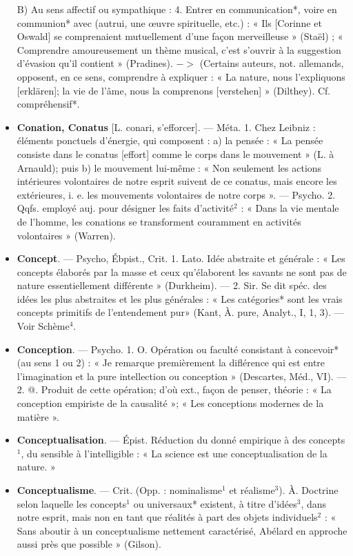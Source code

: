 \begin{itemize}[leftmargin=1cm, label=, itemsep=11pt]
B) Au sens affectif ou sympathique : 4. Entrer en communication*, voire en communion* avec
(autrui, une œuvre spirituelle, etc.) :
« Ils [Corinne et Oswald] se comprenaient mutuellement d’une façon
merveilleuse » (Staël) ; « Comprendre
amoureusement un thème musical,
c'est s'ouvrir à la suggestion d'évasion qu'il contient » (Pradines).
$->$ (Certains auteurs, not. allemands, opposent, en ce sens, comprendre à expliquer : « La nature,
nous l'expliquons [erklären]; la vie
de l'âme, nous la comprenons [verstehen] » (Dilthey). Cf. compréhensif*.

\item {\bf Conation, Conatus} [L. conari, s’efforcer]. — Méta. 1. Chez Leibniz : éléments ponctuels d'énergie, qui composent : a) la pensée : « La pensée
consiste dans le conatus [effort]
comme le corps dans le mouvement » (L. à Arnauld); puis b) le
mouvement lui-même : « Non seulement les actions intérieures volontaires de notre esprit suivent de ce
conatus, mais encore les extérieures,
i. e. les mouvements volontaires de
notre corps ». — Psycho. 2. Qqfs.
employé auj. pour désigner les faits
d'activité$^2$ : « Dans la vie mentale de
l'homme, les conations se transforment
couramment en activités volontaires » (Warren).

\item {\bf Concept}. — Psycho, Ébpist., Crit. 1.
Lato. Idée abstraite et générale :
« Les concepts élaborés par la masse
et ceux qu’élaborent les savants ne
sont pas de nature essentiellement
différente » (Durkheim). — 2. Sir.
Se dit spéc. des idées les plus
abstraites et les plus générales :
« Les catégories* sont les vrais
concepts primitifs de l’entendement
pur» (Kant, À. pure, Analyt., I, 1, 3).
— Voir Schème$^4$.

\item {\bf Conception}. — Psycho. 1. O. Opération ou faculté consistant à concevoir* (au sens 1 ou 2) : « Je remarque
premièrement la diflérence qui est
entre l'imagination et la pure intellection ou conception » (Descartes,
Méd., VI). — 2. @. Produit de cette
opération; d’où ext., façon de penser,
théorie : « La conception empiriste
de la causalité »; « Les conceptions
modernes de la matière ».

\item {\bf Conceptualisation}. — Épist. Réduction
du donné empirique à des concepts$^1$,
du sensible à l'intelligible : « La
science est une conceptualisation de
la nature. »

\item {\bf Conceptualisme}. — Crit. (Opp. : nominalisme$^1$ et réalisme$^3$). À. Doctrine
selon laquelle les concepts$^1$ ou universaux* existent, à titre d'idées$^3$,
dans notre esprit, mais non en tant
que réalités à part des objets individuels$^2$ : « Sans aboutir à un conceptualisme nettement caractérisé, Abélard en approche aussi près que possible » (Gilson).


\end{itemize}
